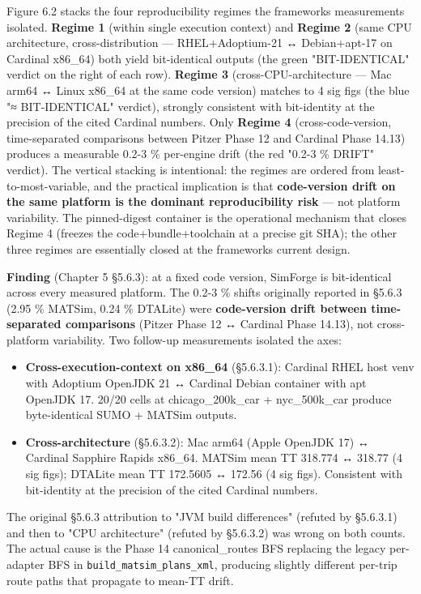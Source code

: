 Figure 6.2 stacks the four reproducibility regimes the
framework\textquotesingle s measurements isolated. \textbf{Regime 1}
(within single execution context) and \textbf{Regime 2} (same CPU
architecture, cross-distribution --- RHEL+Adoptium-21 ↔ Debian+apt-17 on
Cardinal x86\_64) both yield bit-identical outputs (the green
"BIT-IDENTICAL" verdict on the right of each row). \textbf{Regime 3}
(cross-CPU-architecture --- Mac arm64 ↔ Linux x86\_64 at the same code
version) matches to 4 sig figs (the blue "≈ BIT-IDENTICAL" verdict),
strongly consistent with bit-identity at the precision of the cited
Cardinal numbers. Only \textbf{Regime 4} (cross-code-version,
time-separated comparisons between Pitzer Phase 12 and Cardinal Phase
14.13) produces a measurable 0.2-3 \% per-engine drift (the red "0.2-3
\% DRIFT" verdict). The vertical stacking is intentional: the regimes
are ordered from least-to-most-variable, and the practical implication
is that \textbf{code-version drift on the same platform is the dominant
reproducibility risk} --- not platform variability. The pinned-digest
container is the operational mechanism that closes Regime 4 (freezes the
code+bundle+toolchain at a precise git SHA); the other three regimes are
essentially closed at the framework\textquotesingle s current design.

\textbf{Finding} (Chapter 5 §5.6.3): at a fixed code version, SimForge
is bit-identical across every measured platform. The 0.2-3 \% shifts
originally reported in §5.6.3 (2.95 \% MATSim, 0.24 \% DTALite) were
\textbf{code-version drift between time-separated comparisons} (Pitzer
Phase 12 ↔ Cardinal Phase 14.13), not cross-platform variability. Two
follow-up measurements isolated the axes:

\begin{itemize}
\tightlist
\item
  \textbf{Cross-execution-context on x86\_64} (§5.6.3.1): Cardinal RHEL
  host venv with Adoptium OpenJDK 21 ↔ Cardinal Debian container with
  apt OpenJDK 17. 20/20 cells at chicago\_200k\_car + nyc\_500k\_car
  produce byte-identical SUMO + MATSim outputs.
\item
  \textbf{Cross-architecture} (§5.6.3.2): Mac arm64 (Apple OpenJDK 17) ↔
  Cardinal Sapphire Rapids x86\_64. MATSim mean TT 318.774 ↔ 318.77 (4
  sig figs); DTALite mean TT 172.5605 ↔ 172.56 (4 sig figs). Consistent
  with bit-identity at the precision of the cited Cardinal numbers.
\end{itemize}

The original §5.6.3 attribution to "JVM build differences" (refuted by
§5.6.3.1) and then to "CPU architecture" (refuted by §5.6.3.2) was wrong
on both counts. The actual cause is the Phase 14 canonical\_routes BFS
replacing the legacy per-adapter BFS in
\texttt{build\_matsim\_plans\_xml}, producing slightly different
per-trip route paths that propagate to mean-TT drift.

